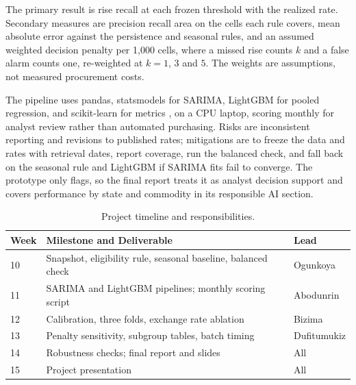 \documentclass[11pt,a4paper]{article}
\begin{document}
The primary result is rise recall at each frozen threshold with the realized rate. Secondary measures are precision recall area on the cells each rule covers, mean absolute error against the persistence and seasonal rules, and an assumed weighted decision penalty per 1{,}000 cells, where a missed rise counts $k$ and a false alarm counts one, re-weighted at $k = 1$, $3$ and $5$. The weights are assumptions, not measured procurement costs.

The pipeline uses pandas, statsmodels for SARIMA, LightGBM for pooled regression, and scikit-learn for metrics \cite{seabold2010statsmodels,pedregosa2011scikit}, on a CPU laptop, scoring monthly for analyst review rather than automated purchasing. Risks are inconsistent reporting and revisions to published rates; mitigations are to freeze the data and rates with retrieval dates, report coverage, run the balanced check, and fall back on the seasonal rule and LightGBM if SARIMA fits fail to converge. The prototype only flags, so the final report treats it as analyst decision support and covers performance by state and commodity in its responsible AI section.

\begin{table}[h!]
  \centering
  \footnotesize
  \renewcommand{\arraystretch}{0.9}
  \setlength{\abovecaptionskip}{2pt}
  \setlength{\belowcaptionskip}{0pt}
  \caption{Project timeline and responsibilities.}
  \label{tab:timeline}
  \begin{tabularx}{\linewidth}{@{}l X l@{}}
    \toprule
    \textbf{Week} & \textbf{Milestone and Deliverable} & \textbf{Lead} \\
    \midrule
    10 & Snapshot, eligibility rule, seasonal baseline, balanced check & Ogunkoya \\
    11 & SARIMA and LightGBM pipelines; monthly scoring script & Abodunrin \\
    12 & Calibration, three folds, exchange rate ablation & Bizima \\
    13 & Penalty sensitivity, subgroup tables, batch timing & Dufitumukiz \\
    14 & Robustness checks; final report and slides & All \\
    15 & Project presentation & All \\
    \bottomrule
  \end{tabularx}
\end{table}


\clearpage


\end{document}
